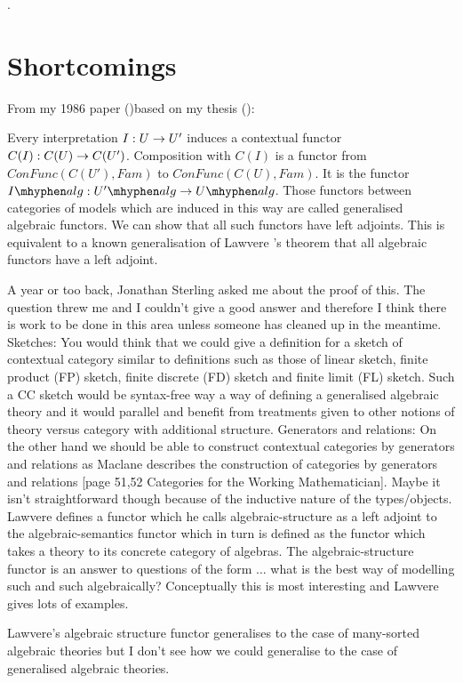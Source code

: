 \note {} .

\section{Shortcomings}

\note From my 1986 paper (\cite{Cartmell86})based on my thesis (\cite{Cartmell78}):
\begin{tightquote}
Every interpretation $I:U \rightarrow U'$ induces a contextual functor 
$C(I):C(U) \rightarrow C(U')$. Composition with $C(I)$ is a functor from 
$ConFunc(C(U'),Fam)$ to
$ConFunc(C(U),Fam)$. It is the functor $\Ialg:\Upalg \morph \Ualg$. Those functors
between categories of models which are induced in this way are called generalised
algebraic functors. We can show that all such functors have left adjoints.
This is
equivalent to a known generalisation of Lawvere \cite{LawvereAlgebraicTheories}'s theorem that all algebraic
functors have a left adjoint. 
\end{tightquote}
A year or too back, Jonathan Sterling asked me about the proof of this. The question threw me and I couldn't give a good answer and therefore I think there is work to be done in this area unless someone has cleaned up in the meantime.
\note
Sketches: You would think that we could give a definition for a sketch of contextual category 
similar to  definitions such as those of linear sketch, finite product (FP) sketch, finite discrete (FD) sketch and finite limit (FL) sketch. Such a CC sketch would be syntax-free way a way of defining a generalised algebraic theory and it would parallel and benefit from treatments given to other notions of theory versus category with additional structure. 
\note
Generators and relations: On the other hand we should be able to construct contextual categories by generators and  
relations as Maclane describes the construction of categories by generators and relations
[page 51,52 Categories for the Working Mathematician]. Maybe it isn't  straightforward  though because of the inductive nature of the types/objects. 
\note
Lawvere defines a functor which he calls algebraic-structure as a  left adjoint  to the algebraic-semantics functor which in turn is defined as the functor which takes a theory to its concrete category of algebras. 
The algebraic-structure functor is an answer to questions of the form ... what is the best way of modelling such and such algebraically? 
Conceptually this is most interesting and Lawvere gives lots of examples. 

Lawvere's algebraic structure functor generalises to the case of many-sorted algebraic theories but I don't see how we could generalise to the case of generalised algebraic theories. 




